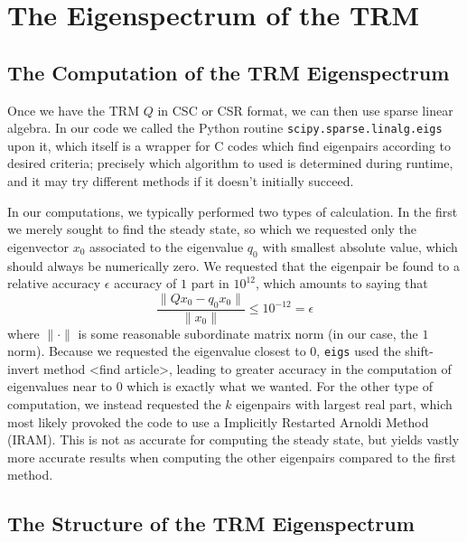 \section{The Eigenspectrum of the TRM}

\subsection{The Computation of the TRM Eigenspectrum}
Once we have the TRM $Q$ in CSC or CSR format, we can then use sparse linear algebra. 
In our code we called the Python routine \texttt{scipy.sparse.linalg.eigs} upon it,
which itself is a wrapper for C codes which find eigenpairs according to desired
criteria; precisely which algorithm to used is determined during runtime, and it may
try different methods if it doesn't initially succeed.

In our computations, we typically performed two types of calculation. In the first we merely sought to
find the steady state, so which we requested only the eigenvector $x_0$
associated to the
eigenvalue $q_0$ with smallest absolute value, which should always be numerically zero.
We requested that the eigenpair be found to a relative accuracy $\epsilon$ accuracy of $1$ part in $10^{12}$,
which amounts to saying that
\begin{equation} \label{eq:linAlgRelAcc}
 \frac{\| Q x_0 - q_0 x_0 \|}{\| x_0 \|} \le 10^{-12} = \epsilon
\end{equation}
where $\| \cdot \|$ is some reasonable subordinate matrix norm (in our case, the $1$ norm). Because we requested the eigenvalue closest to $0$, \texttt{eigs} used the
shift-invert method <find article>, leading to greater accuracy in the computation of
eigenvalues near to $0$ which is exactly what we wanted. For the other type of
computation, we instead requested the $k$ eigenpairs with largest real part, which
most likely provoked the code to use a Implicitly Restarted Arnoldi Method (IRAM).
This is not as accurate for computing the steady state, but yields vastly more accurate
results when computing the other eigenpairs compared to the first method. 

\subsection{The Structure of the TRM Eigenspectrum}

